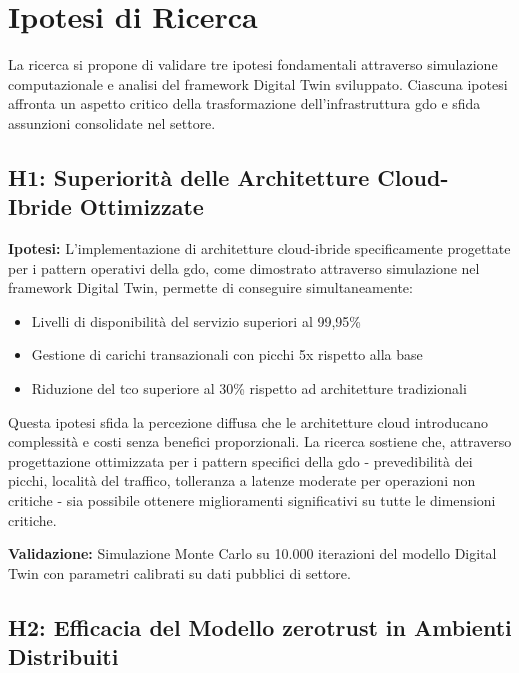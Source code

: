 \section{\texorpdfstring{Ipotesi di Ricerca}{1.4 - Ipotesi di Ricerca}}
\label{sec:ipotesi_ricerca}

La ricerca si propone di validare tre ipotesi fondamentali attraverso simulazione computazionale e analisi del framework Digital Twin sviluppato. Ciascuna ipotesi affronta un aspetto critico della trasformazione dell'infrastruttura \gls{gdo} e sfida assunzioni consolidate nel settore.

\subsection{\texorpdfstring{H1: Superiorità delle Architetture Cloud-Ibride Ottimizzate}{1.4.1 - H1: Superiorità delle Architetture Cloud-Ibride Ottimizzate}}
\label{subsec:h1}

\textbf{Ipotesi:} L'implementazione di architetture cloud-ibride specificamente progettate per i pattern operativi della \gls{gdo}, come dimostrato attraverso simulazione nel framework Digital Twin, permette di conseguire simultaneamente:
\begin{itemize}
\item Livelli di disponibilità del servizio superiori al 99,95\%
\item Gestione di carichi transazionali con picchi 5x rispetto alla base
\item Riduzione del \gls{tco} superiore al 30\% rispetto ad architetture tradizionali
\end{itemize}

Questa ipotesi sfida la percezione diffusa che le architetture cloud introducano complessità e costi senza benefici proporzionali. La ricerca sostiene che, attraverso progettazione ottimizzata per i pattern specifici della \gls{gdo} - prevedibilità dei picchi, località del traffico, tolleranza a latenze moderate per operazioni non critiche - sia possibile ottenere miglioramenti significativi su tutte le dimensioni critiche.

\textbf{Validazione:} Simulazione Monte Carlo su 10.000 iterazioni del modello Digital Twin con parametri calibrati su dati pubblici di settore.

\subsection{\texorpdfstring{H2: Efficacia del Modello \gls{zerotrust} in Ambienti Distribuiti}{1.4.2 - H2: Efficacia del Modello Zero Trust in Ambienti Distribuiti}}
\label{subsec:h2}

